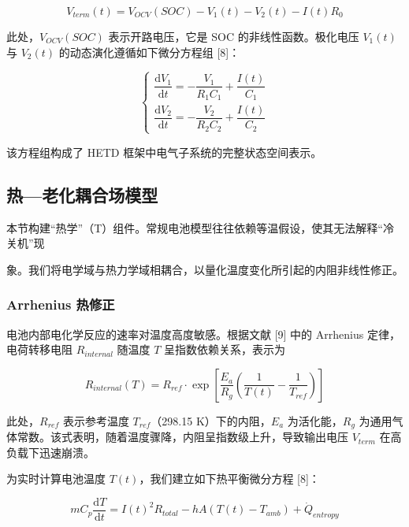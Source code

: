 \documentclass[11pt,a4paper]{ctexart}
\begin{document}
\begin{equation}
V_{term}(t) = V_{OCV}(SOC) - V_1(t) - V_2(t) - I(t)R_0
\end{equation}

此处，$V_{OCV}(SOC)$ 表示开路电压，它是 SOC 的非线性函数。极化电压 $V_1(t)$ 与 $V_2(t)$ 的动态演化遵循如下微分方程组 [8]：

\begin{equation}
\begin{cases}
\dfrac{\mathrm{d}V_1}{\mathrm{d}t} = -\dfrac{V_1}{R_1 C_1} + \dfrac{I(t)}{C_1} \\[8pt]
\dfrac{\mathrm{d}V_2}{\mathrm{d}t} = -\dfrac{V_2}{R_2 C_2} + \dfrac{I(t)}{C_2}
\end{cases}
\end{equation}

该方程组构成了 HETD 框架中电气子系统的完整状态空间表示。

\subsection{热—老化耦合场模型}

本节构建“热学”（T）组件。常规电池模型往往依赖等温假设，使其无法解释“冷关机”现

象。我们将电学域与热力学域相耦合，以量化温度变化所引起的内阻非线性修正。

\subsubsection{Arrhenius 热修正}

电池内部电化学反应的速率对温度高度敏感。根据文献 [9] 中的 Arrhenius 定律，电荷转移电阻 $R_{internal}$ 随温度 $T$ 呈指数依赖关系，表示为

\begin{equation}
R_{internal}(T) = R_{ref} \cdot \exp\left[\frac{E_a}{R_g}\left(\frac{1}{T(t)} - \frac{1}{T_{ref}}\right)\right]
\end{equation}

此处，$R_{ref}$ 表示参考温度 $T_{ref}$（298.15 K）下的内阻，$E_a$ 为活化能，$R_g$ 为通用气体常数。该式表明，随着温度骤降，内阻呈指数级上升，导致输出电压 $V_{term}$ 在高负载下迅速崩溃。

为实时计算电池温度 $T(t)$，我们建立如下热平衡微分方程 [8]：

\begin{equation}
m C_p \frac{\mathrm{d}T}{\mathrm{d}t} = I(t)^2 R_{total} - hA\left(T(t) - T_{amb}\right) + \dot{Q}_{entropy}
\end{equation}
\end{document}
